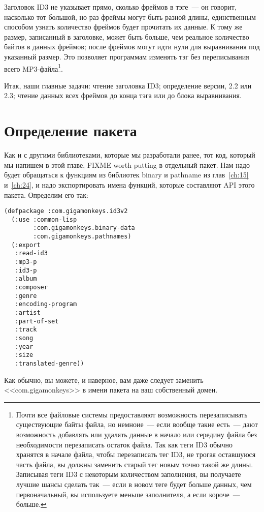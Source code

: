 Заголовок ID3 не указывает прямо, сколько фреймов в тэге~--- он говорит, насколько тот
большой, но раз фреймы могут быть разной длины, единственным способом узнать количество
фреймов будет прочитать их данные.  К тому же размер, записанный в заголовке, может быть
больше, чем реальное количество байтов в данных фреймов; после фреймов могут идти нули для
выравнивания под указанный размер.  Это позволяет программам изменять тэг без
переписывания всего MP3-файла\footnote{Почти все файловые системы предоставляют
  возможность перезаписывать существующие байты файла, но немноие~--- если вообще такие
  есть~--- дают возможность добавлять или удалять данные в начало или середину файла без
  необходимости перезаписать остаток файла. Так как теги ID3 обычно хранятся в начале
  файла, чтобы перезаписать тег ID3, не трогая оставшуюся часть файла, вы должны заменить
  старый тег новым точно такой же длины. Записывая теги ID3 с некоторым количеством
  заполнения, вы получаете лучшие шансы сделать так~--- если в новом теге будет больше
  данных, чем первоначальный, вы используете меньше заполнителя, а если короче~---
  больше.}.

Итак, наши главные задачи: чтение заголовка ID3; определение версии, 2.2 или 2.3; чтение
данных всех фреймов до конца тэга или до блока выравнивания.

\section{Определение пакета}

Как и с другими библиотеками, которые мы разработали ранее, тот код, который мы напишем в
этой главе, FIXME worth putting в отдельный пакет.  Нам надо будет обращаться к функциям
из библиотек binary и pathname из глав~\ref{ch:15} и~\ref{ch:24}, и надо экспортировать
имена функций, которые составляют API этого пакета.  Определим его так:

\begin{lstlisting}
(defpackage :com.gigamonkeys.id3v2
  (:use :common-lisp
        :com.gigamonkeys.binary-data
        :com.gigamonkeys.pathnames)
  (:export
   :read-id3
   :mp3-p
   :id3-p
   :album
   :composer
   :genre
   :encoding-program
   :artist
   :part-of-set
   :track
   :song
   :year
   :size
   :translated-genre))
\end{lstlisting}

Как обычно, вы можете, и наверное, вам даже следует заменить <<com.gigamonkeys>> в имени
пакета на ваш собственный домен.

